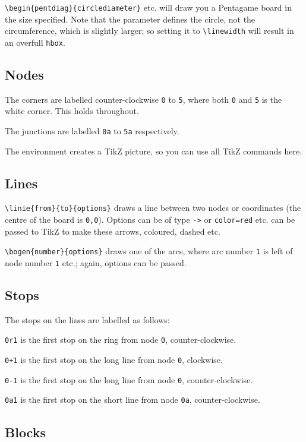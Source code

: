 \documentclass[a5paper]{scrartcl}
\begin{document}
\verb|\begin{pentdiag}{circlediameter}| etc. will draw you a Pentagame board in the size specified. Note that the parameter defines the circle, not the circumference, which is slightly larger; so setting it to \verb|\linewidth| will result in an overfull \verb|hbox|.

\subsection*{Nodes}

The corners are labelled counter-clockwise \verb|0| to \verb|5|, where both \verb|0| and \verb|5| is the white corner. This holds throughout. 

The junctions are labelled \verb|0a| to \verb|5a| respectively.

The environment creates a TikZ picture, so you can use all TikZ commands here. 

\subsection*{Lines}

\verb|\linie{from}{to}{options}| draws a line between two nodes or coordinates (the centre of the board is \verb|0,0|). Options can be of type \verb|->| or \verb|color=red| etc. can be passed to TikZ to make these arrows, coloured, dashed etc. 

\noindent\verb|\bogen{number}{options}| draws one of the arcs, where arc number \verb|1| is left of node number \verb|1| etc.; again, options can be passed. 

\subsection*{Stops}

The stops on the lines are labelled as follows:

    \verb|0r1| is the first stop on the ring from node \verb|0|, counter-clockwise.
    
    \verb|0+1| is the first stop on the long line from node \verb|0|, clockwise.
    
    \verb|0-1| is the first stop on the long line from node \verb|0|, counter-clockwise.
    
    \verb|0a1| is the first stop on the short line from node \verb|0a|, counter-clockwise.

\subsection*{Blocks}
\end{document}

